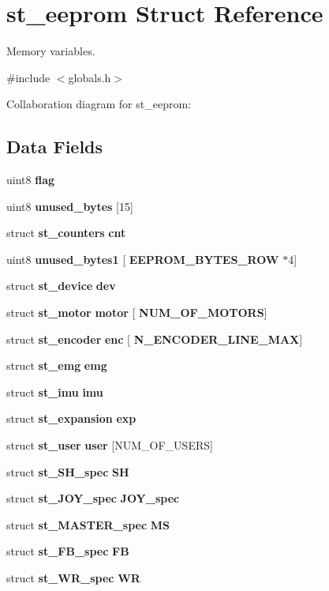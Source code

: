 \section{st\+\_\+eeprom Struct Reference}
\label{structst__eeprom}


Memory variables.  




{\ttfamily \#include $<$globals.\+h$>$}



Collaboration diagram for st\+\_\+eeprom\+:
\subsection*{Data Fields}
\begin{DoxyCompactItemize}
\item 
uint8 \textbf{ flag}
\item 
uint8 \textbf{ unused\+\_\+bytes} [15]
\item 
struct \textbf{ st\+\_\+counters} \textbf{ cnt}
\item 
uint8 \textbf{ unused\+\_\+bytes1} [\textbf{ E\+E\+P\+R\+O\+M\+\_\+\+B\+Y\+T\+E\+S\+\_\+\+R\+OW} $\ast$4]
\item 
struct \textbf{ st\+\_\+device} \textbf{ dev}
\item 
struct \textbf{ st\+\_\+motor} \textbf{ motor} [\textbf{ N\+U\+M\+\_\+\+O\+F\+\_\+\+M\+O\+T\+O\+RS}]
\item 
struct \textbf{ st\+\_\+encoder} \textbf{ enc} [\textbf{ N\+\_\+\+E\+N\+C\+O\+D\+E\+R\+\_\+\+L\+I\+N\+E\+\_\+\+M\+AX}]
\item 
struct \textbf{ st\+\_\+emg} \textbf{ emg}
\item 
struct \textbf{ st\+\_\+imu} \textbf{ imu}
\item 
struct \textbf{ st\+\_\+expansion} \textbf{ exp}
\item 
struct \textbf{ st\+\_\+user} \textbf{ user} [N\+U\+M\+\_\+\+O\+F\+\_\+\+U\+S\+E\+RS]
\item 
struct \textbf{ st\+\_\+\+S\+H\+\_\+spec} \textbf{ SH}
\item 
struct \textbf{ st\+\_\+\+J\+O\+Y\+\_\+spec} \textbf{ J\+O\+Y\+\_\+spec}
\item 
struct \textbf{ st\+\_\+\+M\+A\+S\+T\+E\+R\+\_\+spec} \textbf{ MS}
\item 
struct \textbf{ st\+\_\+\+F\+B\+\_\+spec} \textbf{ FB}
\item 
struct \textbf{ st\+\_\+\+W\+R\+\_\+spec} \textbf{ WR}
\end{DoxyCompactItemize}


